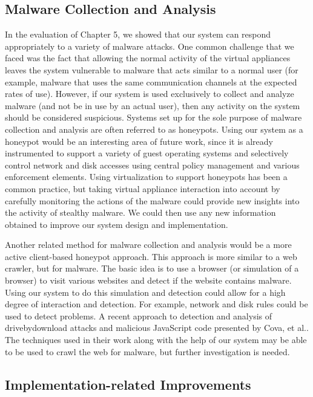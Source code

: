 \subsection{Malware Collection and Analysis}

In the evaluation of Chapter 5, we showed that our system can respond appropriately to a variety of malware attacks. One common challenge that we faced was the fact that allowing the normal activity of the virtual appliances leaves the system vulnerable to malware that acts similar to a normal user (for example, malware that uses the same communication channels at the expected rates of use). However, if our system is used exclusively to collect and analyze malware (and not be in use by an actual user), then any activity on the system should be considered suspicious. Systems set up for the sole purpose of malware collection and analysis are often referred to as honeypots. Using our system as a honeypot would be an interesting area of future work, since it is already instrumented to support a variety of guest operating systems and selectively control network and disk accesses using central policy management and various enforcement elements. Using virtualization to support honeypots has been a common practice\cite{vrable_2005}, but taking virtual appliance interaction into account by carefully monitoring the actions of the malware could provide new insights into the activity of stealthy malware. We could then use any new information obtained to improve our system design and implementation.

Another related method for malware collection and analysis would be a more active client-based honeypot approach. This approach is more similar to a web crawler, but for malware. The basic idea is to use a browser (or simulation of a browser) to visit various websites and detect if the website contains malware.  Using our system to do this simulation and detection could allow for a high degree of interaction and detection. For example, network and disk rules could be used to detect problems. A recent approach to detection and analysis of drive\-by\-download attacks and malicious JavaScript code presented by Cova, et al.\cite{cova_2010}. The techniques used in their work along with the help of our system may be able to be used to crawl the web for malware, but further investigation is needed.

\subsection{Implementation-related Improvements}

